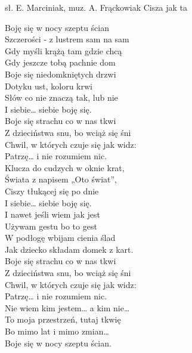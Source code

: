 {sł. E. Marciniak, muz. A. Frąckowiak}
{Cisza jak ta}
\begin{text}
Boję się w nocy szeptu ścian\\
Szczerości - z lustrem sam na sam\\
Gdy myśli krążą tam gdzie chcą\\
Gdy jeszcze tobą pachnie dom\\

Boje się niedomkniętych drzwi\\
Dotyku ust, koloru krwi\\
Słów co nie znaczą tak, lub nie\\
I siebie… siebie boję się.\\

Boje się strachu co w nas tkwi\\
Z dzieciństwa snu, bo wciąż się śni\\
Chwil, w których czuje się jak widz:\\
Patrzę… i nie rozumiem nic.\\

Klucza do cudzych w oknie krat,\\
Świata z napisem „Oto świat”,\\
Ciszy tłukącej się po dnie\\
I siebie… siebie boję się.\\

I nawet jeśli wiem jak jest\\
Używam gestu bo to gest\\
W podłogę wbijam cienia ślad\\
Jak dziecko składam domek z kart.\\

Boje się strachu co w nas tkwi\\
Z dzieciństwa snu, bo wciąż się śni\\
Chwil, w których czuje się jak widz:\\
Patrzę… i nie rozumiem nic.\\

Nie wiem kim jestem… a kim nie…\\
To moja przestrzeń, tutaj tkwię\\
Bo mimo lat i mimo zmian…\\
Boje się w nocy szeptu ścian.\\
\end{text}
